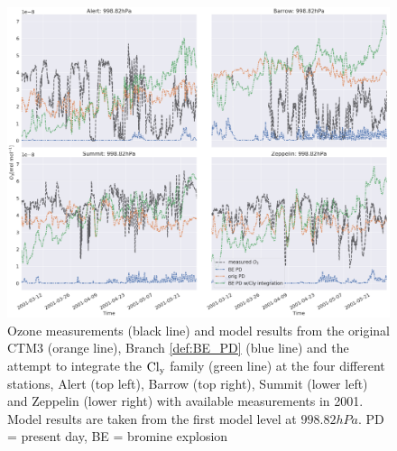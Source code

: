 \begin{figure}
    \centering
    \includegraphics[width = \linewidth]{Chapter6_Results/images/ozone_2001_newClyIntegration.png}
    \caption{Ozone measurements (black line) and model results from the original CTM3 (orange line), Branch \ref{def:BE_PD} (blue line) and the attempt to integrate the $\mathrm{Cl_y}$ family (green line) at the four different stations, Alert (top left), Barrow (top right), Summit (lower left) and Zeppelin (lower right) with available measurements in 2001. Model results are taken from the first model level at $998.82 hPa$. PD = present day, BE = bromine explosion}
    \label{fig:test_ClyInt}
\end{figure}